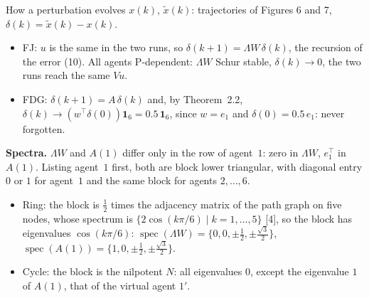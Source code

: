 
\begin{frame}[label=bk-state-input]{How a perturbation evolves}
  \small
  $x(k)$, $\tilde x(k)$: trajectories of Figures 6 and 7, $\delta(k) = \tilde x(k) - x(k)$.
  \begin{itemize}
    \item FJ: $u$ is the same in the two runs, so $\delta(k+1) = \Lambda W\, \delta(k)$, the
          recursion of the error (10). All agents P-dependent: $\Lambda W$ Schur stable,
          $\delta(k) \to 0$, the two runs reach the same $Vu$.
    \item FDG: $\delta(k+1) = A\,\delta(k)$ and, by Theorem~2.2,
          $\delta(k) \to (w^\top \delta(0))\mathbf{1}_6 = 0.5\,\mathbf{1}_6$, since
          $w = e_1$ and $\delta(0) = 0.5\, e_1$: never forgotten.
  \end{itemize}
  \textbf{Spectra.} $\Lambda W$ and $A(1)$ differ only in the row of agent~$1$: zero in
  $\Lambda W$, $e_1^\top$ in $A(1)$. Listing agent~$1$ first, both are block lower
  triangular, with diagonal entry $0$ or $1$ for agent~$1$ and the same block for agents
  $2, \dots, 6$.
  \begin{itemize}
    \item Ring: the block is $\tfrac12$ times the adjacency matrix of the path graph on
          five nodes, whose spectrum is $\{2\cos(k\pi/6) \mid k = 1, \dots, 5\}$ [4], so the
          block has eigenvalues $\cos(k\pi/6)$:
          $\operatorname{spec}(\Lambda W) = \{0, 0, \pm\tfrac12, \pm\tfrac{\sqrt3}{2}\}$,
          $\operatorname{spec}(A(1)) = \{1, 0, \pm\tfrac12, \pm\tfrac{\sqrt3}{2}\}$.
    \item Cycle: the block is the nilpotent $N$: all eigenvalues $0$, except the eigenvalue
          $1$ of $A(1)$, that of the virtual agent $1'$.
  \end{itemize}
\end{frame}

